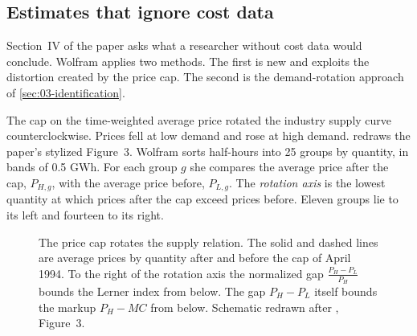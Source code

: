 \subsection{Estimates that ignore cost data}\label{sec:03-wolfram-neio}

Section~IV of the paper asks what a researcher without cost data would conclude. Wolfram applies two methods. The first
is new and exploits the distortion created by the price cap. The second is the demand-rotation approach of
\cref{sec:03-identification}.

The cap on the time-weighted average price rotated the industry supply curve counterclockwise. Prices fell at low
demand and rose at high demand.  redraws the paper's stylized Figure~3. Wolfram sorts
half-hours into 25 groups by quantity, in bands of 0.5 GWh. For each group $g$ she compares the average price after the
cap, $P_{H,g}$, with the average price before, $P_{L,g}$. The \emph{rotation axis} is the lowest quantity at which prices
after the cap exceed prices before. Eleven groups lie to its left and fourteen to its right.

\begin{figure}[htbp]
\centering
{}
\caption{The price cap rotates the supply relation. The solid and dashed lines are average prices by quantity after and
before the cap of April 1994. To the right of the rotation axis the normalized gap $\frac{P_H - P_L}{P_H}$ bounds the
Lerner index from below. The gap $P_H - P_L$ itself bounds the markup $P_H - MC$ from below.
Schematic redrawn after \citet{Wolfram1999}, Figure~3.}
\label{fig:03-pricecap-rotation}
\end{figure}

